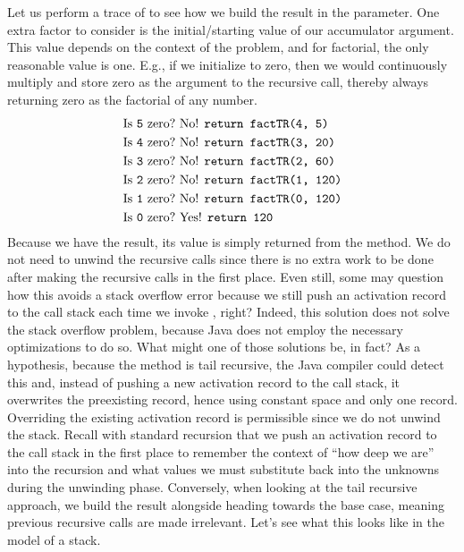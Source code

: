 Let us perform a trace of  to see how we build the result in the  parameter. One extra factor to consider is the initial/starting value of our accumulator argument. This value depends on the context of the problem, and for factorial, the only reasonable value is one. E.g., if we initialize  to zero, then we would continuously multiply and store zero as the argument to the recursive call, thereby always returning zero as the factorial of any number.
\begin{align*}
    \text{Is }\texttt{5} \text{ zero?} &\text{ No! }\texttt{return factTR(4, 5)}\\
    \text{Is }\texttt{4} \text{ zero?} &\text{ No! }\texttt{return factTR(3, 20)}\\
    \text{Is }\texttt{3} \text{ zero?} &\text{ No! }\texttt{return factTR(2, 60)}\\
    \text{Is }\texttt{2} \text{ zero?} &\text{ No! }\texttt{return factTR(1, 120)}\\
    \text{Is }\texttt{1} \text{ zero?} &\text{ No! }\texttt{return factTR(0, 120)}\\
    \text{Is }\texttt{0} \text{ zero?} &\text{ Yes! }\texttt{return 120}
\end{align*}
Because we have the result, its value is simply returned from the method. We do not need to unwind the recursive calls since there is no extra work to be done after making the recursive calls in the first place. Even still, some may question how this avoids a stack overflow error because we still push an activation record to the call stack each time we invoke , right? Indeed, this solution does not solve the stack overflow problem, because Java does not employ the necessary optimizations to do so. What might one of those solutions be, in fact? As a hypothesis, because the method is tail recursive, the Java compiler could detect this and, instead of pushing a new activation record to the call stack, it overwrites the preexisting record, hence using constant space and only one record. Overriding the existing activation record is permissible since we do not unwind the stack. Recall with standard recursion that we push an activation record to the call stack in the first place to remember the context of ``how deep we are'' into the recursion and what values we must substitute back into the unknowns during the unwinding phase. Conversely, when looking at the tail recursive approach, we build the result alongside heading towards the base case, meaning previous recursive calls are made irrelevant. Let's see what this looks like in the model of a stack.
